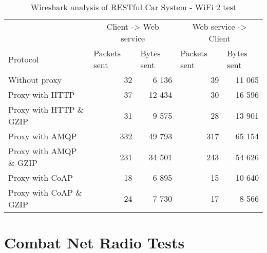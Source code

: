 \begin{appendices}
\begin{table}[H]
\begin{tabular}{lrrrr}
\hline
\multicolumn{1}{l}{}                  & \multicolumn{2}{c}{Client -> Web service}                           & \multicolumn{2}{c}{Web service -> Client}                           \\
\multicolumn{1}{l}{Protocol} & \multicolumn{1}{l}{Packets sent} & \multicolumn{1}{l}{Bytes sent} & \multicolumn{1}{l}{Packets sent} & \multicolumn{1}{l}{Bytes sent} \\ \hline
Without proxy                           & 32                                            & 6 136                                    & 39                                            & 11 065                                   \\
Proxy with HTTP                         & 37                                            & 12 434                                   & 30                                            & 16 596                                   \\
Proxy with HTTP \& GZIP                 & 31                                            & 9 575                                    & 28                                            & 13 901 \\
Proxy with AMQP                         & 332                                            & 49 793                                    & 317                                            & 65 154 \\
Proxy with AMQP \& GZIP                 & 231                                            & 34 501                                    & 243                                            & 54 626 \\
Proxy with CoAP                         & 18                                            & 6 895                                    & 15                                            & 10 640 \\
Proxy with CoAP \& GZIP                 & 24                                            & 7 730                                    & 17                                            & 8 566

\end{tabular}
\caption{Wireshark analysis of RESTful Car System - WiFi 2 test}

\end{table}


\section{Combat Net Radio Tests}


\end{appendices}
